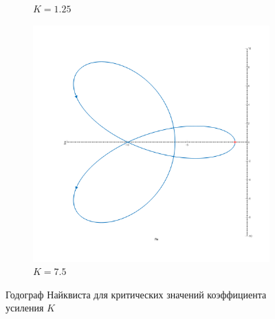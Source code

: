 \begin{figure}[ht!]
\begin{subfigure}{0.5\textwidth}
        \caption{$K = 1.25$}
    \end{subfigure}
    \begin{subfigure}{0.5\textwidth}
        \centering
        \includegraphics[width=\textwidth]{media/plots/task5_nyquist_7.png}
        \caption{$K = 7.5$}
    \end{subfigure}
    \caption{Годограф Найквиста для критических значений коэффициента усиления $K$}
    \label{fig:task5_nyquist_critical}
\end{figure}

